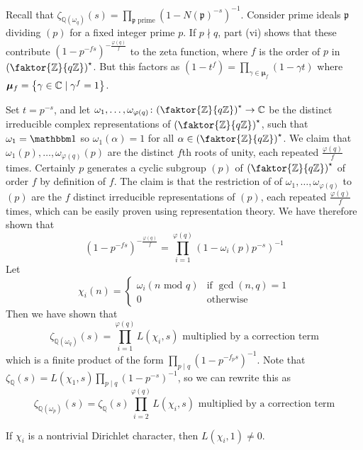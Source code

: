 Recall that \( \zeta_{\mathbb Q(\omega_q)}(s) = \prod_{\mathfrak p \text{ prime}} (1 - N(\mathfrak p)^{-s})^{-1} \).
Consider prime ideals \( \mathfrak p \) dividing \( (p) \) for a fixed integer prime \( p \).
If \( p \nmid q \), part (vi) shows that these contribute \( (1 - p^{-fs})^{-\frac{\varphi(q)}{f}} \) to the zeta function, where \( f \) is the order of \( p \) in \( \qty(\faktor{\mathbb Z}{q\mathbb Z})^\star \).
But this factors as \( (1 - t^f) = \prod_{\gamma \in \bm\mu_f}(1 - \gamma t) \) where \( \bm\mu_f = \qty{\gamma \in \mathbb C \mid \gamma^f = 1} \).

Set \( t = p^{-s} \), and let \( \omega_1, \dots, \omega_{\varphi(q)} \colon \qty(\faktor{\mathbb Z}{q\mathbb Z})^\star \to \mathbb C \) be the distinct irreducible complex representations of \( \qty(\faktor{\mathbb Z}{q\mathbb Z})^\star \), such that \( \omega_1 = \mathbbm 1 \) so \( \omega_1(\alpha) = 1 \) for all \( \alpha \in \qty(\faktor{\mathbb Z}{q\mathbb Z})^\star \).
We claim that \( \omega_1(p), \dots, \omega_{\varphi(q)}(p) \) are the distinct \( f \)th roots of unity, each repeated \( \frac{\varphi(q)}{f} \) times.
Certainly \( p \) generates a cyclic subgroup \( (p) \) of \( \qty(\faktor{\mathbb Z}{q\mathbb Z})^\star \) of order \( f \) by definition of \( f \).
The claim is that the restriction of of \( \omega_1, \dots, \omega_{\varphi(q)} \) to \( (p) \) are the \( f \) distinct irreducible representations of \( (p) \), each repeated \( \frac{\varphi(q)}{f} \) times, which can be easily proven using representation theory.
We have therefore shown that
\[ (1-p^{-fs})^{-\frac{\varphi(q)}{f}} = \prod_{i=1}^{\varphi(q)} (1 - \omega_i(p) p^{-s})^{-1} \]
Let
\[ \chi_i(n) = \begin{cases}
    \omega_i (n \text{ mod } q) & \text{if } \gcd(n,q) = 1 \\
    0 & \text{otherwise}
\end{cases} \]
Then we have shown that
\[ \zeta_{\mathbb Q(\omega_q)}(s) = \prod_{i=1}^{\varphi(q)} L(\chi_i, s) \text{ multiplied by a correction term} \]
which is a finite product of the form \( \prod_{p \mid q} (1 - p^{-f_p s})^{-1} \).
Note that \( \zeta_{\mathbb Q}(s) = L(\chi_1, s) \prod_{p \mid q}(1-p^{-s})^{-1} \), so we can rewrite this as
\[ \zeta_{\mathbb Q(\omega_p)}(s) = \zeta_{\mathbb Q}(s) \prod_{i=2}^{\varphi(q)}L(\chi_i, s) \text{ multiplied by a correction term} \]
\begin{theorem}
    If \( \chi_i \) is a nontrivial Dirichlet character, then \( L(\chi_i, 1) \neq 0 \).
\end{theorem}
